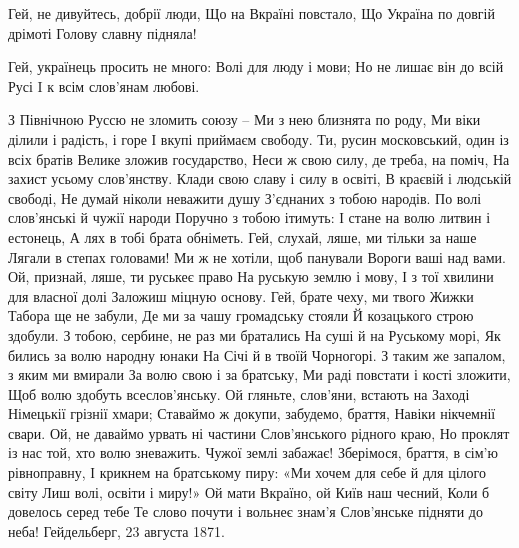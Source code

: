  
 
 


Гей, не дивуйтесь, добрії люди,
Що на Вкраїні повстало,
Що Україна по довгій дрімоті
Голову славну підняла!

Гей, українець просить не много:
Волі для люду і мови;
Но не лишає він до всій Русі
I к всім слов'янам любові.

З Північною Руссю не зломить союзу – 
Ми з нею близнята по роду, 
Ми віки ділили і радість, і горе 
І вкупі приймаєм свободу.
Ти, русин московський, один із всіх братів
Велике зложив государство,
Неси ж свою силу, де треба, на поміч,
На захист усьому слов'янству.
Клади свою славу і силу в освіті,
В краєвій і людській свободі,
Не думай ніколи неважити душу
З'єднаних з тобою народів.
По волі слов'янські й чужії народи
Поручно з тобою ітимуть:
І стане на волю литвин і естонець,
А лях в тобі брата обніметь.
Гей, слухай, ляше, ми тільки за наше
Лягали в степах головами!
Ми ж не хотіли, щоб панували
Вороги ваші над вами.
Ой, признай, ляше, ти руськеє право
На руськую землю і мову,
І з тої хвилини для власної долі
Заложиш міцную основу.
Гей, брате чеху, ми твого Жижки
Табора ще не забули,
Де ми за чашу громадську стояли
Й козацького строю здобули.
З тобою, сербине, не раз ми братались
На суші й на Руському морі,
Як бились за волю народну юнаки
На Січі й в твоїй Чорногорі.
З таким же запалом, з яким ми вмирали
За волю свою і за братську,
Ми раді повстати і кості зложити,
Щоб волю здобуть всеслов'янську.
Ой гляньте, слов'яни, встають на Заході
Німецькії грізнії хмари;
Ставаймо ж докупи, забудемо, браття,
Навіки нікчемнії свари.
Ой, не даваймо урвать ні частини
Слов'янського рідного краю,
Но проклят із нас той, хто волю зневажить.
Чужої землі забажає!
Зберімося, браття, в сім'ю рівноправну,
І крикнем на братському пиру:
«Ми хочем для себе й для цілого світу
Лиш волі, освіти і миру!»
Ой мати Вкраїно, ой Київ наш чесний,
Коли б довелось серед тебе
Те слово почути і вольнеє знам'я
Слов'янське підняти до неба!
Гейдельберг, 23 августа 1871.
